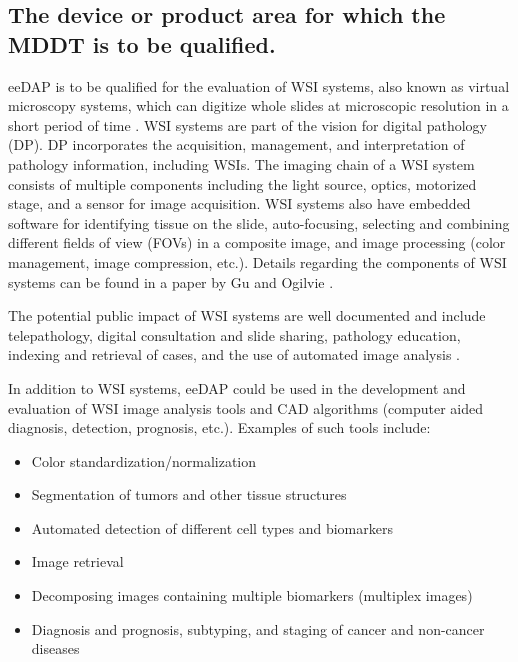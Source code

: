 \documentclass{article}%
\begin{document}
\subsection{The device or product area for which the MDDT is to be qualified.}

\label{the-device-or-product-area-for-which-the-mddt-is-to-be-qualified.}

eeDAP is to be qualified for the evaluation of WSI systems, also known as
virtual microscopy systems, which can digitize whole slides at microscopic
resolution in a short period of time \cite{Rojo2006_Int-J-Surg-Pathol_v14p285}%
. WSI systems are part of the vision for digital pathology (DP). DP
incorporates the acquisition, management, and interpretation of pathology
information, including WSIs. The imaging chain of a WSI system consists of
multiple components including the light source, optics, motorized stage, and a
sensor for image acquisition. WSI systems also have embedded software for
identifying tissue on the slide, auto-focusing, selecting and combining
different fields of view (FOVs) in a composite image, and image processing
(color management, image compression, etc.). Details regarding the components
of WSI systems can be found in a paper by Gu and Ogilvie \cite{Gu2005_book}.

The potential public impact of WSI systems are well documented and include
telepathology, digital consultation and slide sharing, pathology education,
indexing and retrieval of cases, and the use of automated image analysis
\cite{Pantanowitz2011_J-Pathol-Inform_v2p36,
Weinstein2009_Hum-Pathol_v40p1057, Al-Janabi2012_Histopathology_v61p1}.

In addition to WSI systems, eeDAP could be used in the development and
evaluation of WSI image analysis tools and CAD algorithms (computer aided
diagnosis, detection, prognosis, etc.). Examples of such tools include:

\begin{itemize}
\item Color standardization/normalization

\item Segmentation of tumors and other tissue structures

\item Automated detection of different cell types and biomarkers

\item Image retrieval

\item Decomposing images containing multiple biomarkers (multiplex images)

\item Diagnosis and prognosis, subtyping, and staging of cancer and non-cancer diseases
\end{itemize}
\end{document}
